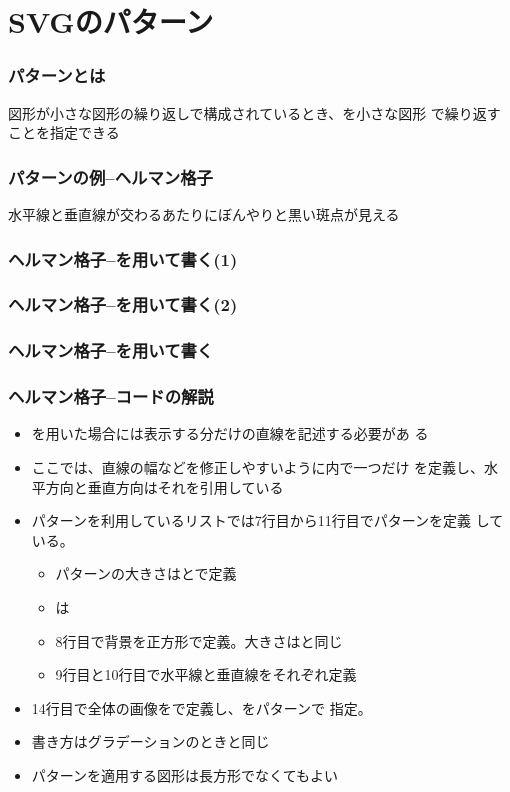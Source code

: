 

\frame{\maketitle}
 \section{SVGのパターン}
\begin{frame}[containsverbatim]
 \frametitle{パターンとは}
 図形が小さな図形の繰り返しで構成されているとき、を小さな図形
 で繰り返すことを指定できる
\end{frame}
\begin{frame}[containsverbatim]
 \frametitle{パターンの例--ヘルマン格子}
水平線と垂直線が交わるあたりにぼんやりと黒い斑点が見える
\end{frame}
\begin{frame}[containsverbatim]
 \frametitle{ヘルマン格子--を用いて書く(1)}
\end{frame}
\begin{frame}[containsverbatim]
 \frametitle{ヘルマン格子--を用いて書く(2)}
\end{frame}
\begin{frame}[containsverbatim]
 \frametitle{ヘルマン格子--を用いて書く}
\end{frame}
\begin{frame}[containsverbatim]
 \frametitle{ヘルマン格子--コードの解説}
 \begin{itemize}
  \item {}を用いた場合には表示する分だけの直線を記述する必要があ
        る
  \item ここでは、直線の幅などを修正しやすいように内で一つだけ
        を定義し、水平方向と垂直方向はそれを引用している
  \item パターンを利用しているリストでは7行目から11行目でパターンを定義
        している。
        \begin{itemize}
         \item パターンの大きさはとで定義
         \item {}は
         \item 8行目で背景を正方形で定義。大きさはと同じ
         \item 9行目と10行目で水平線と垂直線をそれぞれ定義
        \end{itemize}
  \item 14行目で全体の画像をで定義し、をパターンで
        指定。
  \item 書き方はグラデーションのときと同じ
	\item パターンを適用する図形は長方形でなくてもよい
 \end{itemize}
\end{frame}
